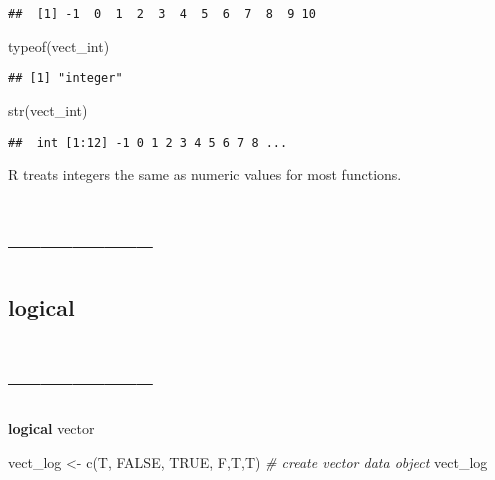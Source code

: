 \documentclass[
]{article}
\newenvironment{Shaded}{\begin{snugshade}}{\end{snugshade}}
\newcommand{\CommentTok}[1]{\textcolor[rgb]{0.56,0.35,0.01}{\textit{#1}}}
\newcommand{\ConstantTok}[1]{\textcolor[rgb]{0.00,0.00,0.00}{#1}}
\newcommand{\FunctionTok}[1]{\textcolor[rgb]{0.00,0.00,0.00}{#1}}
\newcommand{\NormalTok}[1]{#1}
\newcommand{\OtherTok}[1]{\textcolor[rgb]{0.56,0.35,0.01}{#1}}
\begin{document}
\begin{verbatim}
##  [1] -1  0  1  2  3  4  5  6  7  8  9 10
\end{verbatim}

\begin{Shaded}
\begin{Highlighting}[]
\FunctionTok{typeof}\NormalTok{(vect\_int)}
\end{Highlighting}
\end{Shaded}

\begin{verbatim}
## [1] "integer"
\end{verbatim}

\begin{Shaded}
\begin{Highlighting}[]
\FunctionTok{str}\NormalTok{(vect\_int)}
\end{Highlighting}
\end{Shaded}

\begin{verbatim}
##  int [1:12] -1 0 1 2 3 4 5 6 7 8 ...
\end{verbatim}

R treats integers the same as numeric values for most functions.

\hypertarget{section-12}{%
\section{--------------}\label{section-12}}

\hypertarget{logical}{%
\subsection{logical}\label{logical}}

\hypertarget{section-13}{%
\section{--------------}\label{section-13}}

\textbf{logical} vector

\begin{Shaded}
\begin{Highlighting}[]
\NormalTok{vect\_log }\OtherTok{\textless{}{-}} \FunctionTok{c}\NormalTok{(T, }\ConstantTok{FALSE}\NormalTok{, }\ConstantTok{TRUE}\NormalTok{, F,T,T) }\CommentTok{\# create vector data object}
\NormalTok{vect\_log}
\end{Highlighting}
\end{Shaded}
\end{document}
